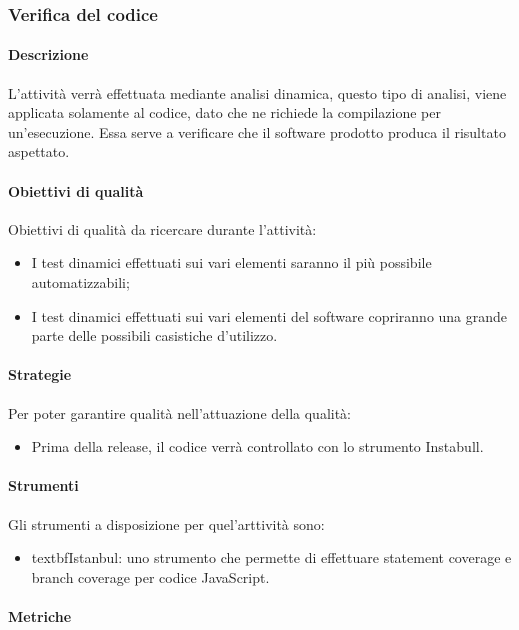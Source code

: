 \documentclass[../NormeDiProgetto_v3.0.0.tex]{subfiles}
\begin{document}
		\subsubsection{Verifica del codice}
			\paragraph{Descrizione}					
				L'attività verrà effettuata mediante analisi dinamica, questo tipo di analisi, viene applicata solamente al codice, dato che ne richiede la compilazione per un'esecuzione. Essa serve a verificare che il software prodotto produca il risultato aspettato.

			\paragraph{Obiettivi di qualità}
				Obiettivi di qualità da ricercare durante l'attività:
				\begin{itemize}
					\item I test dinamici effettuati sui vari elementi saranno il più possibile automatizzabili;
					\item I test dinamici effettuati sui vari elementi del software copriranno una grande parte delle possibili casistiche d'utilizzo.
				\end{itemize}
			
			\paragraph{Strategie}
				Per poter garantire qualità nell'attuazione della qualità:
				\begin{itemize}
					\item Prima della release, il codice verrà controllato con lo strumento Instabull.
				\end{itemize}

			\paragraph{Strumenti}
				Gli strumenti a disposizione per quel'arttività sono:
				\begin{itemize}
					\item textbf{Istanbul}: uno strumento che permette di effettuare statement coverage e branch coverage per codice JavaScript.  
				\end{itemize}

			\paragraph{Metriche}\mbox{}\\
\end{document}
